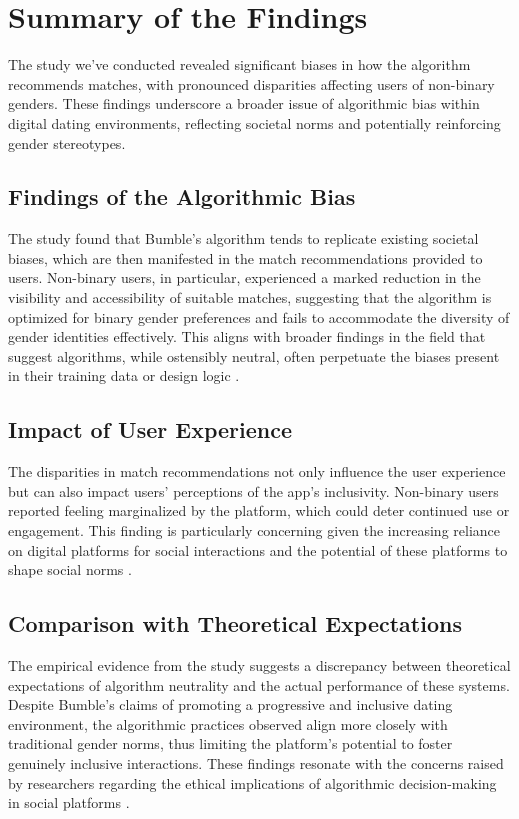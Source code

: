 \section{Summary of the Findings}
The study we've conducted revealed significant biases in how the algorithm recommends matches, with pronounced disparities affecting users of non-binary genders. These findings underscore a broader issue of algorithmic bias within digital dating environments, reflecting societal norms and potentially reinforcing gender stereotypes.

\subsection{Findings of the Algorithmic Bias}
The study found that Bumble's algorithm tends to replicate existing societal biases, which are then manifested in the match recommendations provided to users. Non-binary users, in particular, experienced a marked reduction in the visibility and accessibility of suitable matches, suggesting that the algorithm is optimized for binary gender preferences and fails to accommodate the diversity of gender identities effectively. This aligns with broader findings in the field that suggest algorithms, while ostensibly neutral, often perpetuate the biases present in their training data or design logic \cite{davidson-etal-2019-racial,Selbst_Boyd_Friedler_Venkatasubramanian_Vertesi_2019}.

\subsection{Impact of User Experience}
The disparities in match recommendations not only influence the user experience but can also impact users' perceptions of the app's inclusivity. Non-binary users reported feeling marginalized by the platform, which could deter continued use or engagement. This finding is particularly concerning given the increasing reliance on digital platforms for social interactions and the potential of these platforms to shape social norms \cite{MacLeod_McArthur_2019}.

\subsection{Comparison with Theoretical Expectations}
The empirical evidence from the study suggests a discrepancy between theoretical expectations of algorithm neutrality and the actual performance of these systems. Despite Bumble's claims of promoting a progressive and inclusive dating environment, the algorithmic practices observed align more closely with traditional gender norms, thus limiting the platform's potential to foster genuinely inclusive interactions. These findings resonate with the concerns raised by researchers regarding the ethical implications of algorithmic decision-making in social platforms \cite{Hutson_Taft_Barocas_Levy_2018}.

